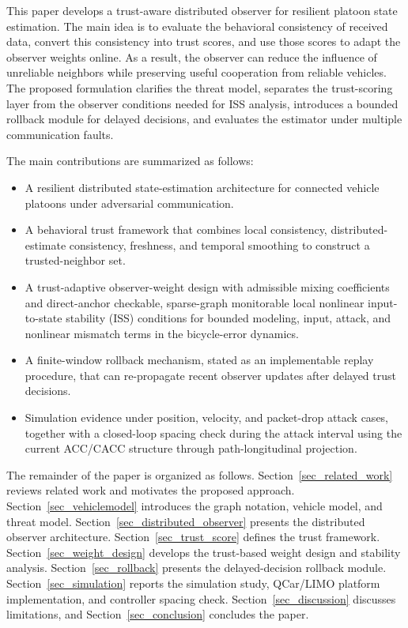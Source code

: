 \documentclass[letterpaper,journal]{IEEEtran}
\begin{document}
This paper develops a trust-aware distributed observer for resilient platoon state estimation. The main idea is to evaluate the behavioral consistency of received data, convert this consistency into trust scores, and use those scores to adapt the observer weights online. As a result, the observer can reduce the influence of unreliable neighbors while preserving useful cooperation from reliable vehicles. The proposed formulation clarifies the threat model, separates the trust-scoring layer from the observer conditions needed for ISS analysis, introduces a bounded rollback module for delayed decisions, and evaluates the estimator under multiple communication faults.

The main contributions are summarized as follows:
\begin{itemize}
    \item A resilient distributed state-estimation architecture for connected vehicle platoons under adversarial communication.
    \item A behavioral trust framework that combines local consistency, distributed-estimate consistency, freshness, and temporal smoothing to construct a trusted-neighbor set.
    \item A trust-adaptive observer-weight design with admissible mixing coefficients and direct-anchor checkable, sparse-graph monitorable local nonlinear input-to-state stability (ISS) conditions for bounded modeling, input, attack, and nonlinear mismatch terms in the bicycle-error dynamics.
    \item A finite-window rollback mechanism, stated as an implementable replay procedure, that can re-propagate recent observer updates after delayed trust decisions.
    \item Simulation evidence under position, velocity, and packet-drop attack cases, together with a closed-loop spacing check during the attack interval using the current ACC/CACC structure through path-longitudinal projection.
\end{itemize}

The remainder of the paper is organized as follows. Section~\ref{sec_related_work} reviews related work and motivates the proposed approach. Section~\ref{sec_vehiclemodel} introduces the graph notation, vehicle model, and threat model. Section~\ref{sec_distributed_observer} presents the distributed observer architecture. Section~\ref{sec_trust_score} defines the trust framework. Section~\ref{sec_weight_design} develops the trust-based weight design and stability analysis. Section~\ref{sec_rollback} presents the delayed-decision rollback module. Section~\ref{sec_simulation} reports the simulation study, QCar/LIMO platform implementation, and controller spacing check. Section~\ref{sec_discussion} discusses limitations, and Section~\ref{sec_conclusion} concludes the paper.
\end{document}
